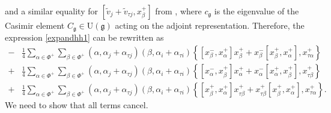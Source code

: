 \documentclass[11pt,reqno]{amsart}
\numberwithin{equation}{section}
\theoremstyle{definition}
\theoremstyle{remark}
\newcommand{\g}{\mathfrak{g}}
\begin{document}
and a similar equality for $[\tilde{v}_j+\tilde{v}_{\tau j}, x_\beta^+]$ from \cite[$\S$3.2 and $\S$4.4]{GNW18}, where $c_\g$ is the eigenvalue of the Casimir element $C_\g \in \mathrm U(\g)$ acting on the adjoint representation. Therefore, the expression \eqref{expandhh1} can be rewritten as
\begin{align*}
-&\tfrac{1}{4}
\sum_{\alpha\in\Phi^{+}}
\sum_{\beta\in\Phi^{+}}
(\alpha,\alpha_j+\alpha_{\tau j})
(\beta,\alpha_i+\alpha_{\tau i})
\left\{
[x_{\beta}^{-},x_{\alpha}^{+}]x_{\beta}^{+}
+x_{\beta}^{-}[x_{\beta}^{+},x_{\alpha}^{+}],
x_{\tau\alpha}^{+}
\right\}
\\
+& \tfrac{1}{4}
\sum_{\alpha\in\Phi^{+}}
\sum_{\beta\in\Phi^{+}}
(\alpha,\alpha_j+\alpha_{\tau j})
(\beta,\alpha_i+\alpha_{\tau i})
\left\{
[x_{\alpha}^{-},x_{\beta}^{+}]x_{\alpha}^{+}
+x_{\alpha}^{-}[x_{\alpha}^{+},x_{\beta}^{+}],
x_{\tau\beta}^{+}
\right\}
\\
+&\tfrac{1}{4}
\sum_{\alpha\in\Phi^{+}}
\sum_{\beta\in\Phi^{+}}
(\alpha,\alpha_j+\alpha_{\tau j})
(\beta,\alpha_i+\alpha_{\tau i})
\left\{
[x_{\beta}^{+},x_{\alpha}^{+}]
x_{\tau\beta}^{+}
+x_{\tau\beta}^{+}
[x_{\beta}^{+},x_{\alpha}^{+}],
x_{\tau\alpha}^{+}
\right\}.
\end{align*}
We need to show that all terms cancel.
\end{document}
